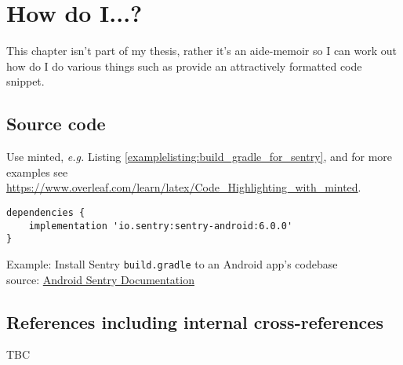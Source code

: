 \chapter{How do I...?}
This chapter isn't part of my thesis, rather it's an aide-memoir so I can work out how do I do various things such as provide an attractively formatted code snippet.

\section{Source code}
Use minted, \textit{e.g.} Listing \ref{examplelisting:build_gradle_for_sentry}, and for more examples see \url{https://www.overleaf.com/learn/latex/Code_Highlighting_with_minted}.

\begin{listing}
\begin{verbatim}
dependencies {
    implementation 'io.sentry:sentry-android:6.0.0'
}
\end{verbatim}
\caption{Example: Install Sentry \texttt{build.gradle} to an Android app's codebase\\source: \href{https://docs.sentry.io/platforms/android/}{Android Sentry Documentation}}
\label{examplelisting:build_gradle_for_sentry}
\end{listing}

\section{References including internal cross-references}
TBC
